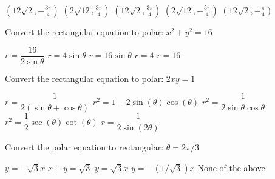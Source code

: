 \documentclass[11pt,answers]{exam}
\begin{document}
\begin{questions}
\begin{minipage}{\linewidth}
\begin{choices}
	\CorrectChoice $\left(12 \sqrt{2},-\frac{3 \pi }{4}\right)$
	\choice $\left(2 \sqrt{12},\frac{3 \pi }{4}\right)$
	\choice $\left(12 \sqrt{2},\frac{3 \pi }{4}\right)$
	\choice $\left(2 \sqrt{12},-\frac{5 \pi }{4}\right)$
	\choice $\left(12 \sqrt{2},-\frac{\pi }{4}\right)$
\end{choices} \answerline

\end{minipage}

\begin{minipage}{\linewidth}



\question Convert the rectangular equation to polar: $x^2 + y^2 = 16$

\begin{choices}
	\choice $r = \dfrac{16}{2\sin\theta}$
	\choice $r = 4 \sin \theta$
	\choice $r = 16 \sin \theta$
	\CorrectChoice $r = 4$
	\choice $r=16$
\end{choices} \answerline
\end{minipage}

\begin{minipage}{\linewidth}



\question Convert the rectangular equation to polar: $2xy=1$

\begin{choices}
	\choice $r = \dfrac{1}{2(\sin\theta + \cos\theta)}$
	\choice $r^2 = 1 - 2\sin(\theta)\cos(\theta)$
	\CorrectChoice $r^2 = \dfrac{1}{2\sin\theta\cos\theta}$
	\choice $r^2 = \dfrac{1}{2}\sec(\theta)\cot(\theta)$
	\choice $r = \dfrac{1}{2\sin(2\theta)}$
\end{choices} \answerline
\end{minipage}

\begin{minipage}{\linewidth}


\question Convert the polar equation to rectangular: $\theta = 2\pi/3$

\begin{choices}
	\correctchoice $y = -\sqrt3 x$
	\choice $x+y = \sqrt3$
	\choice $y = \sqrt3 x$
	\choice $y = -(1/\sqrt3) x$
	\choice None of the above
\end{choices} \answerline


\end{minipage}

\begin{minipage}{\linewidth}



\end{minipage}
\end{questions}
\end{document}
